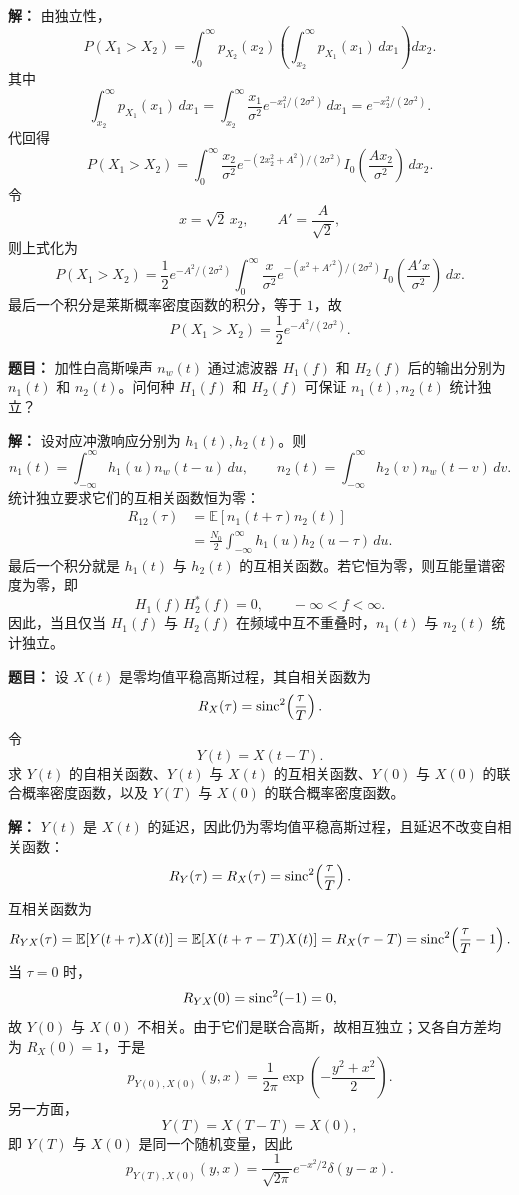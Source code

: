 \par\textbf{解：}
由独立性，
\[
P(X_1>X_2)=\int_0^\infty p_{X_2}(x_2)\left(\int_{x_2}^{\infty}p_{X_1}(x_1)\,dx_1\right)dx_2.
\]
其中
\[
\int_{x_2}^{\infty}p_{X_1}(x_1)\,dx_1
=\int_{x_2}^{\infty}\frac{x_1}{\sigma^2}e^{-x_1^2/(2\sigma^2)}\,dx_1
=e^{-x_2^2/(2\sigma^2)}.
\]
代回得
\[
P(X_1>X_2)=\int_0^\infty \frac{x_2}{\sigma^2}
e^{-(2x_2^2+A^2)/(2\sigma^2)}I_0\!\left(\frac{Ax_2}{\sigma^2}\right)\,dx_2.
\]
令
\[
x=\sqrt{2}\,x_2,\qquad A'=\frac{A}{\sqrt2},
\]
则上式化为
\[
P(X_1>X_2)=\frac12 e^{-A^2/(2\sigma^2)}
\int_0^\infty \frac{x}{\sigma^2}
e^{-(x^2+A'^2)/(2\sigma^2)}I_0\!\left(\frac{A'x}{\sigma^2}\right)\,dx.
\]
最后一个积分是莱斯概率密度函数的积分，等于 $1$，故
\[
P(X_1>X_2)=\frac12 e^{-A^2/(2\sigma^2)}.
\]

\medskip
{}
\textbf{题目：}
加性白高斯噪声 $n_w(t)$ 通过滤波器 $H_1(f)$ 和 $H_2(f)$ 后的输出分别为 $n_1(t)$ 和 $n_2(t)$。问何种 $H_1(f)$ 和 $H_2(f)$ 可保证 $n_1(t),n_2(t)$ 统计独立？

\par\textbf{解：}
设对应冲激响应分别为 $h_1(t),h_2(t)$。则
\[
n_1(t)=\int_{-\infty}^{\infty}h_1(u)n_w(t-u)\,du,
\qquad
n_2(t)=\int_{-\infty}^{\infty}h_2(v)n_w(t-v)\,dv.
\]
统计独立要求它们的互相关函数恒为零：
\begin{align*}
R_{12}(\tau)
&=\mathbb{E}[n_1(t+\tau)n_2(t)] \\
&=\frac{N_0}{2}\int_{-\infty}^{\infty}h_1(u)h_2(u-\tau)\,du.
\end{align*}
最后一个积分就是 $h_1(t)$ 与 $h_2(t)$ 的互相关函数。若它恒为零，则互能量谱密度为零，即
\[
H_1(f)H_2^*(f)=0,\qquad -\infty<f<\infty.
\]
因此，当且仅当 $H_1(f)$ 与 $H_2(f)$ 在频域中互不重叠时，$n_1(t)$ 与 $n_2(t)$ 统计独立。

\medskip
{}
\textbf{题目：}
设 $X(t)$ 是零均值平稳高斯过程，其自相关函数为
\[
R_X(\tau)=\operatorname{sinc}^2\!\left(\frac{\tau}{T}\right).
\]
令
\[
Y(t)=X(t-T).
\]
求 $Y(t)$ 的自相关函数、$Y(t)$ 与 $X(t)$ 的互相关函数、$Y(0)$ 与 $X(0)$ 的联合概率密度函数，以及 $Y(T)$ 与 $X(0)$ 的联合概率密度函数。

\par\textbf{解：}
$Y(t)$ 是 $X(t)$ 的延迟，因此仍为零均值平稳高斯过程，且延迟不改变自相关函数：
\[
R_Y(\tau)=R_X(\tau)=\operatorname{sinc}^2\!\left(\frac{\tau}{T}\right).
\]
互相关函数为
\[
R_{YX}(\tau)=\mathbb{E}[Y(t+\tau)X(t)]
=\mathbb{E}[X(t+\tau-T)X(t)]
=R_X(\tau-T)
=\operatorname{sinc}^2\!\left(\frac{\tau}{T}-1\right).
\]
当 $\tau=0$ 时，
\[
R_{YX}(0)=\operatorname{sinc}^2(-1)=0,
\]
故 $Y(0)$ 与 $X(0)$ 不相关。由于它们是联合高斯，故相互独立；又各自方差均为 $R_X(0)=1$，于是
\[
p_{Y(0),X(0)}(y,x)=\frac{1}{2\pi}\exp\!\left(-\frac{y^2+x^2}{2}\right).
\]
另一方面，
\[
Y(T)=X(T-T)=X(0),
\]
即 $Y(T)$ 与 $X(0)$ 是同一个随机变量，因此
\[
p_{Y(T),X(0)}(y,x)=\frac{1}{\sqrt{2\pi}}e^{-x^2/2}\delta(y-x).
\]

